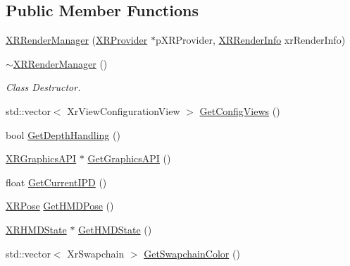 \subsection*{Public Member Functions}
\begin{DoxyCompactItemize}
\item 
\mbox{\hyperlink{class_open_x_r_provider_1_1_x_r_render_manager_a8ffc871639334f7e2cebfe41f2340b42}{X\+R\+Render\+Manager}} (\mbox{\hyperlink{class_open_x_r_provider_1_1_x_r_provider}{X\+R\+Provider}} $\ast$p\+X\+R\+Provider, \mbox{\hyperlink{struct_open_x_r_provider_1_1_x_r_render_info}{X\+R\+Render\+Info}} xr\+Render\+Info)
\item 
\mbox{\hyperlink{class_open_x_r_provider_1_1_x_r_render_manager_a876800efe7e4a85a4aa291db72fae4ee}{$\sim$\+X\+R\+Render\+Manager}} ()
\begin{DoxyCompactList}\small\item\em Class Destructor. \end{DoxyCompactList}\item 
std\+::vector$<$ Xr\+View\+Configuration\+View $>$ \mbox{\hyperlink{class_open_x_r_provider_1_1_x_r_render_manager_a41bf28f97e9ce4cdae0e8bff1f35a670}{Get\+Config\+Views}} ()
\item 
bool \mbox{\hyperlink{class_open_x_r_provider_1_1_x_r_render_manager_af9c80d37753ba2ae24fe2f1aca91ebd0}{Get\+Depth\+Handling}} ()
\item 
\mbox{\hyperlink{class_open_x_r_provider_1_1_x_r_graphics_a_p_i}{X\+R\+Graphics\+A\+PI}} $\ast$ \mbox{\hyperlink{class_open_x_r_provider_1_1_x_r_render_manager_a7484db5238c64c870c189c8db3403b83}{Get\+Graphics\+A\+PI}} ()
\item 
float \mbox{\hyperlink{class_open_x_r_provider_1_1_x_r_render_manager_abcef1310df0483107fbbb00dd41ff546}{Get\+Current\+I\+PD}} ()
\item 
\mbox{\hyperlink{struct_open_x_r_provider_1_1_x_r_pose}{X\+R\+Pose}} \mbox{\hyperlink{class_open_x_r_provider_1_1_x_r_render_manager_a02a943efc18f105316b86a669d20ef2e}{Get\+H\+M\+D\+Pose}} ()
\item 
\mbox{\hyperlink{struct_open_x_r_provider_1_1_x_r_h_m_d_state}{X\+R\+H\+M\+D\+State}} $\ast$ \mbox{\hyperlink{class_open_x_r_provider_1_1_x_r_render_manager_af6289267e9bf20f6e4d65e4051dd9944}{Get\+H\+M\+D\+State}} ()
\item 
std\+::vector$<$ Xr\+Swapchain $>$ \mbox{\hyperlink{class_open_x_r_provider_1_1_x_r_render_manager_ae97da10203b51fe701ccd57b4299bc9b}{Get\+Swapchain\+Color}} ()
\item 

\end{DoxyCompactItemize}
